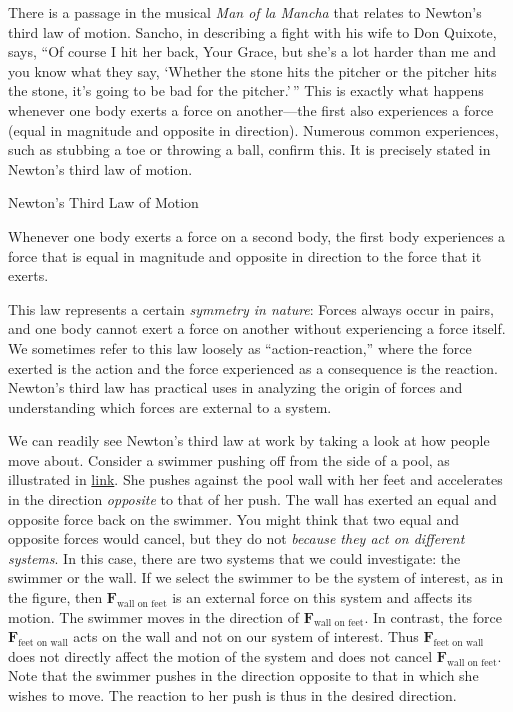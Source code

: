 \documentclass[
]{book}
\newenvironment{note}{}{}
\begin{document}
There is a passage in the musical \emph{Man of la
Mancha} that relates to Newton's third law
of motion. Sancho, in describing a fight with his wife to Don Quixote,
says, ``Of course I hit her back, Your Grace, but she's a lot harder than
me and you know what they say, `Whether the stone hits the pitcher or
the pitcher hits the stone, it's going to be bad for the pitcher.'\,'' This
is exactly what happens whenever one body exerts a force on
another---the first also experiences a force (equal in magnitude and
opposite in direction). Numerous common experiences, such as stubbing a
toe or throwing a ball, confirm this. It is precisely stated in
\protect\hypertarget{import-auto-id1260844}{}{Newton's third law of motion}.

\hypertarget{fs-id2688761}{}
\begin{note}

Newton's Third Law of Motion

Whenever one body exerts a force on a second body, the first body
experiences a force that is equal in magnitude and opposite in direction
to the force that it exerts.

\end{note}

This law represents a certain \emph{symmetry in nature}: Forces always occur
in pairs, and one body cannot exert a force on another without
experiencing a force itself. We sometimes refer to this law loosely as
``action-reaction,'' where the force exerted is the action and the force
experienced as a consequence is the reaction. Newton's third law has
practical uses in analyzing the origin of forces and understanding which
forces are external to a system.

We can readily see Newton's third law at work by taking a look at how
people move about. Consider a swimmer pushing off from the side of a
pool, as illustrated in
\protect\hyperlink{import-auto-id2338100}{link}. She pushes
against the pool wall with her feet and accelerates in the direction
\emph{opposite} to that of her push. The wall has exerted an equal and
opposite force back on the swimmer. You might think that two equal and
opposite forces would cancel, but they do not \emph{because they act on
different systems}. In this case, there are two systems that we could
investigate: the swimmer or the wall. If we select the swimmer to be the
system of interest, as in the figure, then
\(\textbf{F}_{\text{wall\ on\ feet}}{}\) is an external force on this
system and affects its motion. The swimmer moves in the direction of
\(\textbf{F}_{\text{wall\ on\ feet}}{}\). In contrast, the force
\(\textbf{F}_{\text{feet\ on\ wall}}{}\) acts on the wall and not on our
system of interest. Thus \(\textbf{F}_{\text{feet\ on\ wall}}{}\) does not
directly affect the motion of the system and does not cancel
\(\textbf{F}_{\text{wall\ on\ feet}}{}\). Note that the swimmer pushes in
the direction opposite to that in which she wishes to move. The reaction
to her push is thus in the desired direction.
\end{document}
